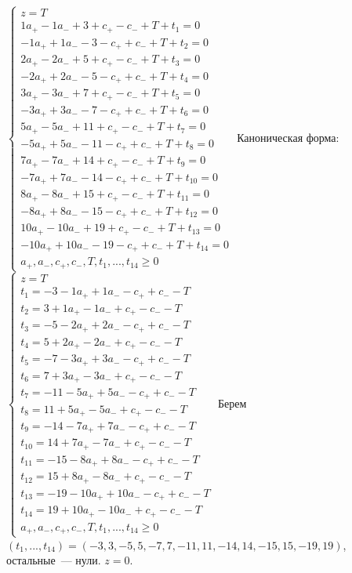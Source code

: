 \documentclass[a4paper]{article}
\begin{document}
$\left\{\begin{array}{lll}
z=T\\
1a_+-1a_-+3+c_+-c_-+T+t_{1}=0\\
-1a_++1a_--3-c_++c_-+T+t_{2}=0\\

2a_+-2a_-+5+c_+-c_-+T+t_{3}=0\\
-2a_++2a_--5-c_++c_-+T+t_{4}=0\\

3a_+-3a_-+7+c_+-c_-+T+t_{5}=0\\
-3a_++3a_--7-c_++c_-+T+t_{6}=0\\

5a_+-5a_-+11+c_+-c_-+T+t_{7}=0\\
-5a_++5a_--11-c_++c_-+T+t_{8}=0\\

7a_+-7a_-+14+c_+-c_-+T+t_{9}=0\\
-7a_++7a_--14-c_++c_-+T+t_{10}=0\\

8a_+-8a_-+15+c_+-c_-+T+t_{11}=0\\
-8a_++8a_--15-c_++c_-+T+t_{12}=0\\

10a_+-10a_-+19+c_+-c_-+T+t_{13}=0\\
-10a_++10a_--19-c_++c_-+T+t_{14}=0\\

a_+,a_-,c_+,c_-,T,t_1,...,t_{14}\geqslant 0
\end{array}\right.$\newline
Каноническая форма:
$\left\{\begin{array}{lll}
z=T\\
t_{1}=-3-1a_++1a_--c_++c_--T\\
t_{2}=3+1a_+-1a_-+c_+-c_--T\\
t_{3}=-5-2a_++2a_--c_++c_--T\\
t_{4}=5+2a_+-2a_-+c_+-c_--T\\
t_{5}=-7-3a_++3a_--c_++c_--T\\
t_{6}=7+3a_+-3a_-+c_+-c_--T\\
t_{7}=-11-5a_++5a_--c_++c_--T\\
t_{8}=11+5a_+-5a_-+c_+-c_--T\\
t_{9}=-14-7a_++7a_--c_++c_--T\\
t_{10}=14+7a_+-7a_-+c_+-c_--T\\
t_{11}=-15-8a_++8a_--c_++c_--T\\
t_{12}=15+8a_+-8a_-+c_+-c_--T\\
t_{13}=-19-10a_++10a_--c_++c_--T\\
t_{14}=19+10a_+-10a_-+c_+-c_--T\\
a_+,a_-,c_+,c_-,T,t_1,...,t_{14}\geqslant 0
\end{array}\right.$\newline
Берем $(t_1,...,t_14)=(-3,3,-5,5,-7,7,-11,11,-14,14,-15,15,-19,19)$, остальные~--- нули. $z=0$.
\newpage
\end{document}
